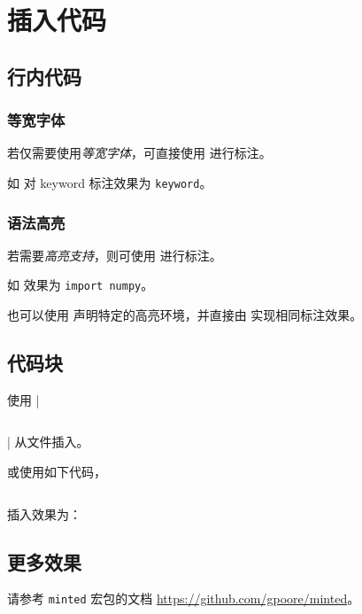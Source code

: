 \section{插入代码}

\subsection{行内代码}
\subsubsection{等宽字体}
若仅需要使用\emph{等宽字体}，可直接使用 \latex{\texttt} 进行标注。

如  对 keyword 标注效果为 \texttt{keyword}。

\subsubsection{语法高亮}
若需要\emph{高亮支持}，则可使用 \latex{\mintinline} 进行标注。

如  效果为 \texttt{import numpy}。

也可以使用  声明特定的高亮环境，并直接由  实现相同标注效果。

\subsection{代码块}
使用 \latex|\inputminted{python}{src/xxx.py}| 从文件插入。

或使用如下代码，
\inputminted{latex}{src/code.tex}

插入效果为：


\subsection{更多效果}
请参考 \texttt{minted} 宏包的文档 \url{https://github.com/gpoore/minted}。
